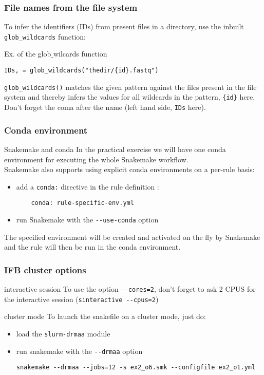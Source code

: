 \begin{frame}[containsverbatim]
\frametitle{File names from the file system}
To infer the identifiers (IDs) from present files in a directory, use the inbuilt \verb|glob_wildcards| function:
\begin{block}{Ex. of the glob$\_$wilcards function}
\begin{lstlisting}
IDs, = glob_wildcards("thedir/{id}.fastq")
\end{lstlisting}
\end{block}
\verb|glob_wildcards()| matches the given pattern against the files present in the file system and thereby infers the values for all wildcards in the pattern, \verb|{id}| here. 
\vfill
Don't forget the coma after the name (left hand side, \verb|IDs| here).
\end{frame}
\begin{frame}[containsverbatim]
\frametitle{Conda environment}
\begin{block}{Snakemake and conda}
In the practical exercise we will have one conda environment for executing the whole Snakemake workflow. \\
Snakemake also supports using explicit conda environments on a per-rule basis:
\begin{itemize}
    \item add a \verb|conda:| directive in the rule definition :
\begin{lstlisting}
    conda: rule-specific-env.yml
\end{lstlisting}
    \item run Snakemake with the \verb|--use-conda| option
\end{itemize}
The specified environment will be created and activated on the fly by Snakemake and the rule will then be run in the conda environment.
\end{block}
\end{frame}
\begin{frame}[containsverbatim]
\frametitle{IFB cluster options}
\begin{block}{interactive session}
To use the option \verb|--cores=2|, don't forget to ask 2 CPUS for the interactive session (\verb|sinteractive --cpus=2|)
\end{block}
\begin{block}{cluster mode}
To launch the snakefile on a cluster mode, just do:
\begin{itemize}
    \item load the \verb|slurm-drmaa| module
    \item run snakemake with the \verb|--drmaa| option
\begin{lstlisting}
snakemake --drmaa --jobs=12 -s ex2_o6.smk --configfile ex2_o1.yml
\end{lstlisting}
\end{itemize}
\end{block}
\end{frame}
